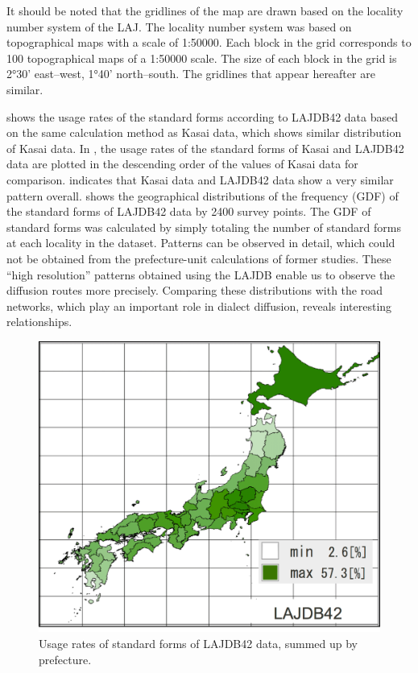 \documentclass[output=paper]{LSP/langsci}
\begin{document}
It should be noted that the gridlines of the map are drawn based on the locality number system of the LAJ. The locality number system was based on topographical maps with a scale of 1:50000. Each block in the grid corresponds to 100 topographical maps of a 1:50000 scale. The size of each block in the grid is 2°30' east–west, 1°40' north–south. The gridlines that appear hereafter are similar.

 shows the usage rates of the standard forms according to LAJDB42 data based on the same calculation method as Kasai data, which shows similar distribution of Kasai data. In , the usage rates of the standard forms of Kasai and LAJDB42 data are plotted in the descending order of the values of Kasai data for comparison.  indicates that Kasai data and LAJDB42 data show a very similar pattern overall.  shows the geographical distributions of the frequency (GDF) of the standard forms of LAJDB42 data by 2400 survey points. The GDF of standard forms was calculated by simply totaling the number of standard forms at each locality in the dataset. Patterns can be observed in detail, which could not be obtained from the prefecture-unit calculations of former studies. These “high resolution” patterns obtained using the LAJDB enable us to observe the diffusion routes more precisely. Comparing these distributions with the road networks, which play an important role in dialect diffusion, reveals interesting relationships.


\begin{figure}[p]
\includegraphics[height=0.4\textheight]{illustrations/kuma_fig04}
\caption{Usage rates of standard forms of LAJDB42 data, summed up by prefecture.}          
\label{fig:kuma:4}
\end{figure}  
\end{document}
